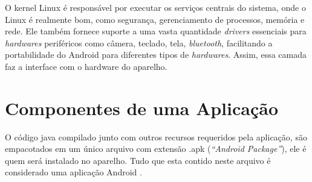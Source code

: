 O kernel Linux é responsável por executar os serviços centrais do sistema, onde o Linux é realmente bom, como segurança, gerenciamento de processos, 
memória e rede. Ele também fornece suporte a uma vasta quantidade \textit{drivers} essenciais para \textit{hardwares} periféricos como câmera, teclado, 
tela, \textit{bluetooth}, facilitando a portabilidade do Android para diferentes tipos de \textit{hardwares}. 
Assim, essa camada faz a interface com o hardware do aparelho.

\section{Componentes de uma Aplicação}
  O código java compilado junto com outros recursos requeridos pela aplicação, são empacotados em um único arquivo com 
  extensão .apk (\textit{``Android Package''}), ele é quem será instalado no aparelho. 
  Tudo que esta contido neste arquivo é considerado uma aplicação Android \cite{android0}. 

